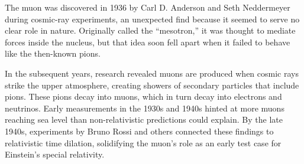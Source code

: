 \begin{historical}
The muon was discovered in 1936 by Carl D. Anderson and Seth Neddermeyer during cosmic-ray experiments, an unexpected find because it seemed to serve no clear role in nature. Originally called the “mesotron,” it was thought to mediate forces inside the nucleus, but that idea soon fell apart when it failed to behave like the then-known pions.

In the subsequent years, research revealed muons are produced when cosmic rays strike the upper atmosphere, creating showers of secondary particles that include pions. These pions decay into muons, which in turn decay into electrons and neutrinos. Early measurements in the 1930s and 1940s hinted at more muons reaching sea level than non-relativistic predictions could explain. By the late 1940s, experiments by Bruno Rossi and others connected these findings to relativistic time dilation, solidifying the muon's role as an early test case for Einstein’s special relativity.
\end{historical}
